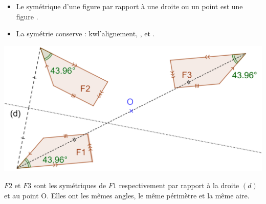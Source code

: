 \documentclass[xcolor={dvipsnames}]{beamer}
\begin{document}
\begin{frame}
	\begin{myprop}
		\begin{itemize}
			\item Le symétrique d'une figure par rapport à une droite ou un point est une figure .
			\item La symétrie conserve : kw{l'alignement}, ,  et .\pause
		\end{itemize}
		 
	\end{myprop}
	
	\begin{myex}
		\begin{center}
			\includegraphics[scale=0.1]{sym_figures}
		\end{center}
		
		$F2$ et $F3$ sont les symétriques \pause  de $F1$ respectivement par rapport à la droite $(d)$ et \pause au point O. Elles ont \pause les mêmes angles, le même périmètre et la même aire.
	\end{myex}
\end{frame}
\end{document}

